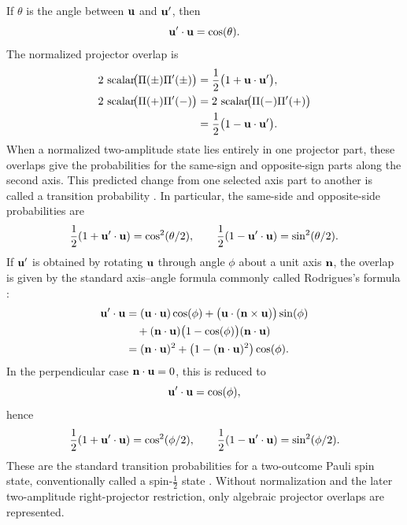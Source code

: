 If \(\theta\) is the angle between \(\mathbf{u}\) and \(\mathbf{u}'\), then
\begin{equation*}
\mathbf{u}'\cdot\mathbf{u}=\cos(\theta).
\end{equation*}
The normalized projector overlap is
\begin{equation*}
\begin{aligned}
2\,\operatorname{scalar}\!\bigl(\Pi(\pm)\Pi'(\pm)\bigr)
&=\frac12\bigl(1+\mathbf{u}\cdot\mathbf{u}'\bigr),\\
2\,\operatorname{scalar}\!\bigl(\Pi(+)\Pi'(-)\bigr)
&=2\,\operatorname{scalar}\!\bigl(\Pi(-)\Pi'(+)\bigr)\notag\\
&=\frac12\bigl(1-\mathbf{u}\cdot\mathbf{u}'\bigr).
\end{aligned}
\end{equation*}
When a normalized two-amplitude state lies entirely in one projector part,
these overlaps give the probabilities for the same-sign and opposite-sign
parts along the second axis. This predicted change from one selected axis
part to another is called a transition probability
\cite{sakurai2017}. In particular, the same-side and opposite-side
probabilities are
\begin{equation*}
\frac12(1+\mathbf{u}'\cdot\mathbf{u})=\cos^2(\theta/2),
\qquad
\frac12(1-\mathbf{u}'\cdot\mathbf{u})=\sin^2(\theta/2).
\end{equation*}
If \(\mathbf{u}'\) is obtained by rotating \(\mathbf{u}\) through angle \(\phi\)
about a unit axis \(\mathbf{n}\), the overlap is given by the standard
axis--angle formula commonly called Rodrigues's formula
\cite{doran2003}:
\begin{align*}
\mathbf{u}'\cdot\mathbf{u}
&=(\mathbf{u}\cdot\mathbf{u})\cos(\phi)
+\bigl(\mathbf{u}\cdot(\mathbf{n}\times\mathbf{u})\bigr)\sin(\phi)\notag\\
&\quad+(\mathbf{n}\cdot\mathbf{u})\bigl(1-\cos(\phi)\bigr)(\mathbf{n}\cdot\mathbf{u})\notag\\
&=(\mathbf{n}\cdot\mathbf{u})^2+\bigl(1-(\mathbf{n}\cdot\mathbf{u})^2\bigr)\cos(\phi).
\end{align*}
In the perpendicular case \(\mathbf{n}\cdot\mathbf{u}=0\), this is reduced to
\begin{equation*}
\mathbf{u}'\cdot\mathbf{u}=\cos(\phi),
\end{equation*}
hence
\begin{equation*}
\frac12(1+\mathbf{u}'\cdot\mathbf{u})=\cos^2(\phi/2),
\qquad
\frac12(1-\mathbf{u}'\cdot\mathbf{u})=\sin^2(\phi/2).
\end{equation*}
These are the standard transition probabilities for a two-outcome Pauli
spin state, conventionally called a spin-\(\tfrac12\) state
\cite{pauli1927,sakurai2017}. Without normalization and the later
two-amplitude right-projector restriction, only algebraic projector overlaps
are represented.

